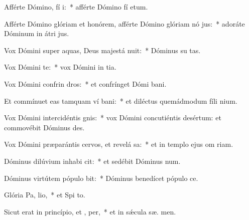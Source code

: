 \item Afférte Dómino, fí i:~* afférte Dómino fí etum.
\item Afférte Dómino glóriam et honórem, afférte Dómino glóriam nó jus:~* adoráte Dóminum in átri  jus.
\item Vox Dómini super aquas, Deus majestá nuit:~* Dóminus su  tas.
\item Vox Dómini  te:~* vox Dómini in tia.
\item Vox Dómini confrin dros:~* et confrínget Dómi  bani.
\item Et commínuet eas tamquam ví bani:~* et diléctus quemádmodum fíli nium.
\item Vox Dómini intercidéntis  gnis:~* vox Dómini concutiéntis desértum: et commovébit Dóminus  des.
\item Vox Dómini præparántis cervos, et revelá sa:~* et in templo ejus om  riam.
\item Dóminus dilúvium inhabi cit:~* et sedébit Dóminus   num.
\item Dóminus virtútem pópulo  bit:~* Dóminus benedícet pópulo   ce.
\item Glória Pa,  lio,~* et Spi to.
\item Sicut erat in princípio, et ,  per,~* et in sǽcula sæ. men.
